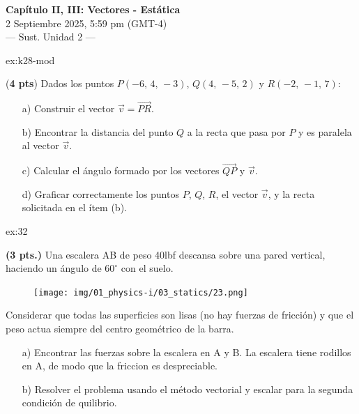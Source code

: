  \begin{multicols}{2}
   \begin{center}
         \LARGE{\textbf{Capítulo II, III: Vectores -  Estática}}\\	
         \vspace{0.2cm}
         \large{2 Septiembre 2025, 5:59 pm (GMT-4)}\\
         \large{— Sust. Unidad 2 —}
     \end{center}

    \begin{excercise}[][][]{ex:k28-mod}{(\textbf{4 pts})
        Dados los puntos  $P(-6,\,4,\,-3)$, $Q(4,\,-5,\,2)$ y $R(-2,\,-1,\,7)$:  
        \begin{itemize}
            \item[a)] Construir el vector $\vec{v}=\overrightarrow{PR}$.  
            \item[b)] Encontrar la distancia del punto $Q$ a la recta que pasa por $P$ y es paralela al vector $\vec{v}$.  
            \item[c)] Calcular el ángulo formado por los vectores $\vec{QP}$ y $\vec{v}$.  
            \item[d)] Graficar correctamente los puntos $P$, $Q$, $R$, el vector $\vec{v}$, y la recta solicitada en el ítem (b).  
        \end{itemize}
    }
    \end{excercise}

 
    \begin{excercise}[][][$F_1=F_3=11.5\ \mathrm{lbf} $, $F_2=40\ \mathrm{lgf}$]{ex:32}{ \textbf{(3 pts.)}
        Una escalera AB de peso 40lbf descansa sobre una pared vertical, haciendo un ángulo de $60^\circ$ con el suelo.   
        \begin{figure}[H]
             \centering
             \texttt{[image: img/01\_physics-i/03\_statics/23.png]}
         \end{figure}     
        Considerar que todas las superficies son lisas (no hay fuerzas de fricción) y que el peso actua siempre del centro geométrico de la barra. 
        \begin{itemize}
             \item[a)] Encontrar las fuerzas sobre la escalera en A y B. La escalera tiene rodillos en A, de modo que la friccion es despreciable.  
             \item[b)] Resolver el problema usando el método vectorial y escalar para la segunda condición de quilibrio.
         \end{itemize} 
         }
     \end{excercise}


\end{multicols}
